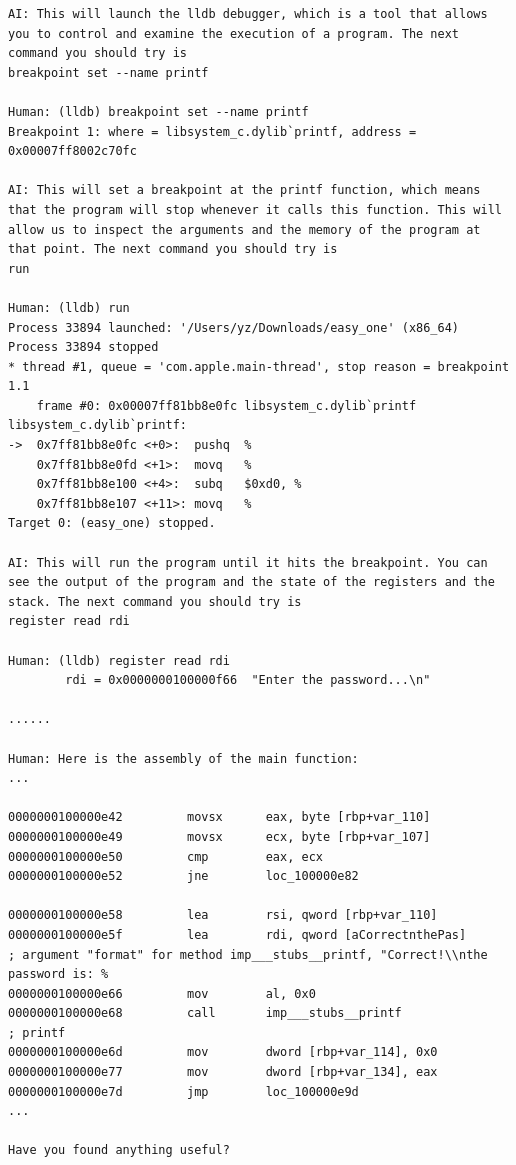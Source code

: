\begin{tcolorbox}[colback=white!5!white,enhanced, breakable, colback=white!5!white]
\begin{verbatim}
AI: This will launch the lldb debugger, which is a tool that allows you to control and examine the execution of a program. The next command you should try is
breakpoint set --name printf

Human: (lldb) breakpoint set --name printf
Breakpoint 1: where = libsystem_c.dylib`printf, address = 0x00007ff8002c70fc

AI: This will set a breakpoint at the printf function, which means that the program will stop whenever it calls this function. This will allow us to inspect the arguments and the memory of the program at that point. The next command you should try is
run

Human: (lldb) run
Process 33894 launched: '/Users/yz/Downloads/easy_one' (x86_64)
Process 33894 stopped
* thread #1, queue = 'com.apple.main-thread', stop reason = breakpoint 1.1
    frame #0: 0x00007ff81bb8e0fc libsystem_c.dylib`printf
libsystem_c.dylib`printf:
->  0x7ff81bb8e0fc <+0>:  pushq  %
    0x7ff81bb8e0fd <+1>:  movq   %
    0x7ff81bb8e100 <+4>:  subq   $0xd0, %
    0x7ff81bb8e107 <+11>: movq   %
Target 0: (easy_one) stopped.

AI: This will run the program until it hits the breakpoint. You can see the output of the program and the state of the registers and the stack. The next command you should try is
register read rdi

Human: (lldb) register read rdi
        rdi = 0x0000000100000f66  "Enter the password...\n"

......

Human: Here is the assembly of the main function:
...

0000000100000e42         movsx      eax, byte [rbp+var_110]
0000000100000e49         movsx      ecx, byte [rbp+var_107]
0000000100000e50         cmp        eax, ecx
0000000100000e52         jne        loc_100000e82

0000000100000e58         lea        rsi, qword [rbp+var_110]
0000000100000e5f         lea        rdi, qword [aCorrectnthePas]                ; argument "format" for method imp___stubs__printf, "Correct!\\nthe password is: %
0000000100000e66         mov        al, 0x0
0000000100000e68         call       imp___stubs__printf                         ; printf
0000000100000e6d         mov        dword [rbp+var_114], 0x0
0000000100000e77         mov        dword [rbp+var_134], eax
0000000100000e7d         jmp        loc_100000e9d
...

Have you found anything useful?


\end{verbatim}
\end{tcolorbox}
